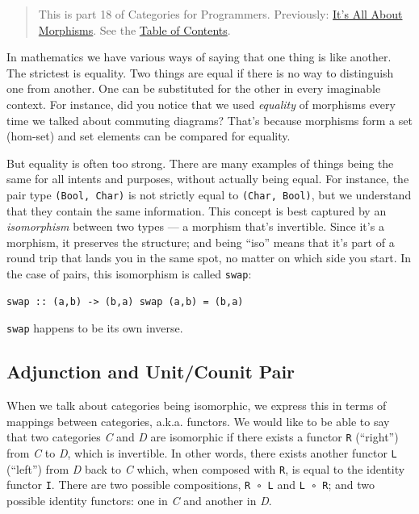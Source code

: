 \begin{quote}
This is part 18 of Categories for Programmers. Previously:
\href{https://bartoszmilewski.com/2015/11/17/its-all-about-morphisms/}{It's
All About Morphisms}. See the
\href{https://bartoszmilewski.com/2014/10/28/category-theory-for-programmers-the-preface/}{Table
of Contents}.
\end{quote}

In mathematics we have various ways of saying that one thing is like
another. The strictest is equality. Two things are equal if there is no
way to distinguish one from another. One can be substituted for the
other in every imaginable context. For instance, did you notice that we
used \emph{equality} of morphisms every time we talked about commuting
diagrams? That's because morphisms form a set (hom-set) and set elements
can be compared for equality.

But equality is often too strong. There are many examples of things
being the same for all intents and purposes, without actually being
equal. For instance, the pair type \texttt{(Bool,\ Char)} is not
strictly equal to \texttt{(Char,\ Bool)}, but we understand that they
contain the same information. This concept is best captured by an
\emph{isomorphism} between two types --- a morphism that's invertible.
Since it's a morphism, it preserves the structure; and being ``iso''
means that it's part of a round trip that lands you in the same spot, no
matter on which side you start. In the case of pairs, this isomorphism
is called \texttt{swap}:

\begin{verbatim}
swap :: (a,b) -> (b,a) swap (a,b) = (b,a)
\end{verbatim}

\texttt{swap} happens to be its own inverse.

\subsection{Adjunction and Unit/Counit
Pair}\label{adjunction-and-unitcounit-pair}

When we talk about categories being isomorphic, we express this in terms
of mappings between categories, a.k.a. functors. We would like to be
able to say that two categories \emph{C} and \emph{D} are isomorphic if
there exists a functor \texttt{R} (``right'') from \emph{C} to \emph{D},
which is invertible. In other words, there exists another functor
\texttt{L} (``left'') from \emph{D} back to \emph{C} which, when
composed with \texttt{R}, is equal to the identity functor \texttt{I}.
There are two possible compositions, \texttt{R\ ∘\ L} and
\texttt{L\ ∘\ R}; and two possible identity functors: one in \emph{C}
and another in \emph{D}.

